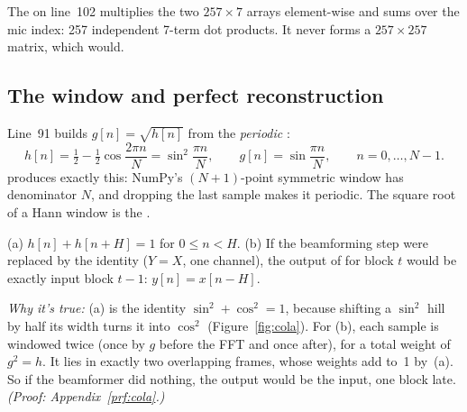 \documentclass[11pt]{article}
\begin{document}
The  on line~102 multiplies the two $257\times7$ arrays
element-wise and sums over the mic index: 257 independent 7-term dot products. It never forms
a $257\times257$ matrix, which  would.

\subsection{The window and perfect reconstruction}

Line~91 builds $g[n]=\sqrt{h[n]}$ from the \emph{periodic} :
\begin{equation}
  h[n]=\tfrac12-\tfrac12\cos\!\frac{2\pi n}{N}=\sin^2\!\frac{\pi n}{N},
  \qquad g[n]=\sin\frac{\pi n}{N},\qquad n=0,\dots,N-1.
\end{equation}
 produces exactly this: NumPy's $(N{+}1)$-point symmetric window
has denominator $N$, and dropping the last sample makes it periodic. The square root of a Hann
window is the .

\begin{proposition}\label{prop:cola}
(a) $h[n]+h[n+H]=1$ for $0\le n<H$.
(b) If the beamforming step were replaced by the identity ($Y=X$, one channel), the output of
 for block $t$ would be exactly input block $t-1$: $y[n]=x[n-H]$.
\end{proposition}
\noindent\emph{Why it's true:} (a) is the identity $\sin^2+\cos^2=1$, because shifting a
$\sin^2$ hill by half its width turns it into $\cos^2$ (Figure~\ref{fig:cola}). For (b), each
sample is windowed twice (once by $g$ before the FFT and once after), for a total weight of
$g^2=h$. It lies in exactly two overlapping frames, whose weights add to~1 by~(a). So if the
beamformer did nothing, the output would be the input, one block late.
\emph{(Proof: Appendix~\ref{prf:cola}.)}
\end{document}
